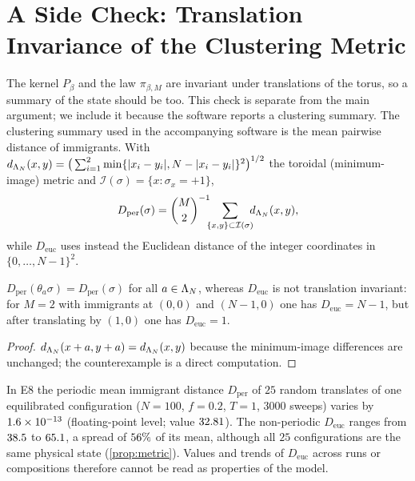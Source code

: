 \section{A Side Check: Translation Invariance of the Clustering Metric}\label{app:metric}
The kernel $P_\beta$ and the law $\pi_{\beta,M}$ are invariant under translations of the torus, so a summary of the state should be too. This check is separate from the main argument; we include it because the software reports a clustering summary. The clustering summary used in the accompanying software is the mean pairwise distance of immigrants. With $d_{\Lambda_N}(x,y)=\big(\sum_{i=1}^{2}\min\{|x_i-y_i|,N-|x_i-y_i|\}^2\big)^{1/2}$ the toroidal (minimum-image) metric and $\mathcal I(\sigma)=\{x:\sigma_x=+1\}$,
\[
D_{\mathrm{per}}(\sigma)=\binom{M}{2}^{-1}\!\!\!\sum_{\{x,y\}\subset\mathcal I(\sigma)}\!\!\! d_{\Lambda_N}(x,y),
\]
while $D_{\mathrm{euc}}$ uses instead the Euclidean distance of the integer coordinates in $\{0,\dots,N-1\}^2$.
\begin{proposition}\label{prop:metric}
$D_{\mathrm{per}}(\theta_a\sigma)=D_{\mathrm{per}}(\sigma)$ for all $a\in\Lambda_N$, whereas $D_{\mathrm{euc}}$ is not translation invariant: for $M=2$ with immigrants at $(0,0)$ and $(N-1,0)$ one has $D_{\mathrm{euc}}=N-1$, but after translating by $(1,0)$ one has $D_{\mathrm{euc}}=1$.
\end{proposition}
\begin{proof}
$d_{\Lambda_N}(x+a,y+a)=d_{\Lambda_N}(x,y)$ because the minimum-image differences are unchanged; the counterexample is a direct computation.
\end{proof}

In E8 the periodic mean immigrant distance $D_{\mathrm{per}}$ of $25$ random translates of one equilibrated configuration ($N=100$, $f=0.2$, $T=1$, $3000$ sweeps) varies by $1.6\times10^{-13}$ (floating-point level; value $32.81$). The non-periodic $D_{\mathrm{euc}}$ ranges from $38.5$ to $65.1$, a spread of $56\%$ of its mean, although all $25$ configurations are the same physical state (\cref{prop:metric}). Values and trends of $D_{\mathrm{euc}}$ across runs or compositions therefore cannot be read as properties of the model.

